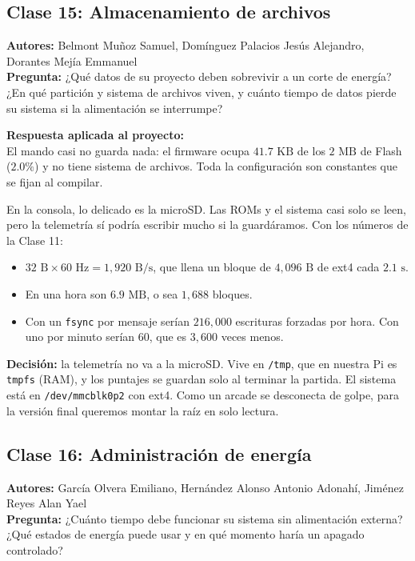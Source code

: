 \documentclass[conference]{IEEEtran}
\begin{document}
\subsection{Clase 15: Almacenamiento de archivos}
\textbf{Autores:} Belmont Muñoz Samuel, Domínguez Palacios Jesús Alejandro, Dorantes Mejía Emmanuel \\
\textbf{Pregunta:} ¿Qué datos de su proyecto deben sobrevivir a un corte de energía? ¿En qué partición y sistema de archivos viven, y cuánto tiempo de datos pierde su sistema si la alimentación se interrumpe?

\textbf{Respuesta aplicada al proyecto:} \\
El mando casi no guarda nada: el firmware ocupa $41.7\text{ KB}$ de los $2\text{ MB}$ de Flash ($2.0\%$) y no tiene sistema de archivos. Toda la configuración son constantes que se fijan al compilar.

En la consola, lo delicado es la microSD. Las ROMs y el sistema casi solo se leen, pero la telemetría sí podría escribir mucho si la guardáramos. Con los números de la Clase 11:
\begin{itemize}
    \item $32\text{ B} \times 60\text{ Hz} = 1{,}920\text{ B/s}$, que llena un bloque de $4{,}096\text{ B}$ de ext4 cada $2.1\text{ s}$.
    \item En una hora son $6.9\text{ MB}$, o sea $1{,}688$ bloques.
    \item Con un \texttt{fsync} por mensaje serían $216{,}000$ escrituras forzadas por hora. Con uno por minuto serían $60$, que es $3{,}600$ veces menos.
\end{itemize}

\textbf{Decisión:} la telemetría no va a la microSD. Vive en \texttt{/tmp}, que en nuestra Pi es \texttt{tmpfs} (RAM), y los puntajes se guardan solo al terminar la partida. El sistema está en \texttt{/dev/mmcblk0p2} con ext4. Como un arcade se desconecta de golpe, para la versión final queremos montar la raíz en solo lectura.

\subsection{Clase 16: Administración de energía}
\textbf{Autores:} García Olvera Emiliano, Hernández Alonso Antonio Adonahí, Jiménez Reyes Alan Yael \\
\textbf{Pregunta:} ¿Cuánto tiempo debe funcionar su sistema sin alimentación externa? ¿Qué estados de energía puede usar y en qué momento haría un apagado controlado?
\end{document}
